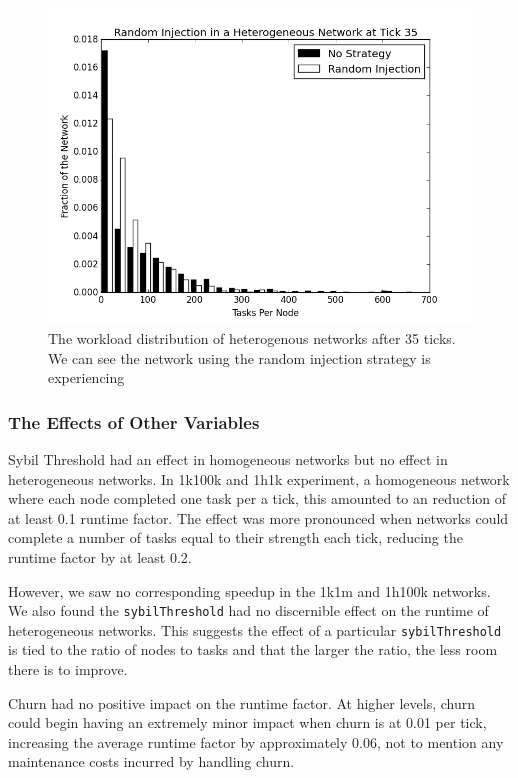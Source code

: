 \begin{figure}
\centering
\includegraphics[width=0.7\linewidth]{figs/randomStableHistHetero35}
\caption[Random injection in a Heterogenous Network]{The workload distribution of heterogenous networks after 35 ticks.  We can see the network using the random injection strategy is experiencing}
\label{fig:randomStableHistHetero35}
\end{figure}



\subsubsection{The Effects of Other Variables}

Sybil Threshold had an effect in homogeneous networks but no effect in heterogeneous networks.
In 1k100k and 1h1k experiment, a homogeneous network where each node completed one task per a tick, this amounted to an reduction of at least 0.1 runtime factor.
The effect was more pronounced when networks could complete a number of tasks equal to their strength each tick, reducing the runtime factor by at least 0.2.

However, we saw no corresponding speedup in the 1k1m and 1h100k networks.
We also found the \texttt{sybilThreshold} had no discernible effect on the runtime of heterogeneous networks.
This suggests the effect of a particular \texttt{sybilThreshold} is tied to the ratio of nodes to tasks and that the larger the ratio, the less room there is to improve.


Churn had no positive impact on the runtime factor.
At higher levels, churn could begin having an extremely minor impact when churn is at 0.01 per tick, increasing the average runtime factor by approximately 0.06, not to mention any maintenance costs incurred by handling churn.



